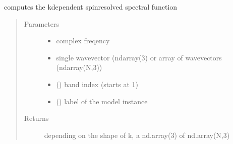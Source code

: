 \documentclass[letterpaper,10pt,english]{sphinxmanual}
\begin{document}
\begin{fulllineitems}
\label{\detokenize{functions:pyqcm.spin_spectral_function}}
\sphinxAtStartPar
computes the k\sphinxhyphen{}dependent spin\sphinxhyphen{}resolved spectral function
\begin{quote}\begin{description}
\item[{Parameters}] \leavevmode\begin{itemize}
\item {} 
\sphinxAtStartPar
{} \textendash{} complex freqency

\item {} 
\sphinxAtStartPar
{} \textendash{} single wavevector (ndarray(3) or array of wavevectors (ndarray(N,3))

\item {} 
\sphinxAtStartPar
{} () \textendash{} band index (starts at 1)

\item {} 
\sphinxAtStartPar
{} () \textendash{} label of the model instance

\end{itemize}

\item[{Returns}] \leavevmode
\sphinxAtStartPar
depending on the shape of k, a nd.array(3) of nd.array(N,3)

\end{description}\end{quote}

\end{fulllineitems}

\end{document}
